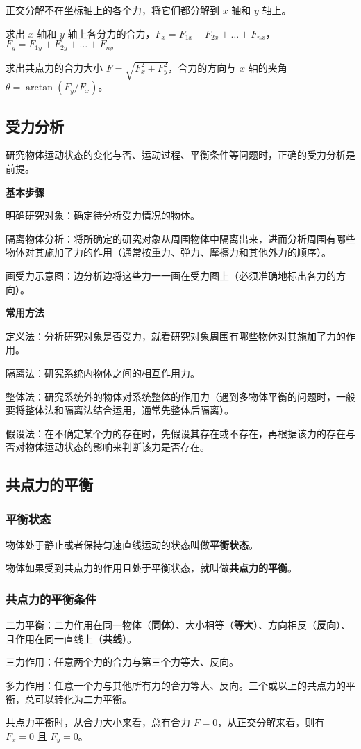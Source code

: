 正交分解不在坐标轴上的各个力，将它们都分解到 $x$ 轴和 $y$ 轴上。

求出 $x$ 轴和 $y$ 轴上各分力的合力，$F_{x}=F_{{1x}}+F_{{2x}}+\dots+F_{{nx}}$，$F_{y}=F_{{1y}}+F_{{2y}}+\dots+F_{{ny}}$

求出共点力的合力大小 $F=\sqrt{F_x^2+F_y^2}$，合力的方向与 $x$ 轴的夹角 $\theta=\arctan(F_y/F_x)$。

\subsection{受力分析}
研究物体运动状态的变化与否、运动过程、平衡条件等问题时，正确的受力分析是前提。

\textbf{基本步骤}

明确研究对象：确定待分析受力情况的物体。

隔离物体分析：将所确定的研究对象从周围物体中隔离出来，进而分析周围有哪些物体对其施加了力的作用（通常按重力、弹力、摩擦力和其他外力的顺序）。

画受力示意图：边分析边将这些力一一画在受力图上（必须准确地标出各力的方向）。

\textbf{常用方法}

定义法：分析研究对象是否受力，就看研究对象周围有哪些物体对其施加了力的作用。

隔离法：研究系统内物体之间的相互作用力。

整体法：研究系统外的物体对系统整体的作用力（遇到多物体平衡的问题时，一般要将整体法和隔离法结合运用，通常先整体后隔离）。

假设法：在不确定某个力的存在时，先假设其存在或不存在，再根据该力的存在与否对物体运动状态的影响来判断该力是否存在。

\subsection{共点力的平衡}
\subsubsection{平衡状态}
物体处于静止或者保持匀速直线运动的状态叫做\textbf{平衡状态}。

物体如果受到共点力的作用且处于平衡状态，就叫做\textbf{共点力的平衡}。

\subsubsection{共点力的平衡条件}
二力平衡：二力作用在同一物体（\textbf{同体}）、大小相等（\textbf{等大}）、方向相反（\textbf{反向}）、且作用在同一直线上（\textbf{共线}）。

三力作用：任意两个力的合力与第三个力等大、反向。

多力作用：任意一个力与其他所有力的合力等大、反向。三个或以上的共点力的平衡，总可以转化为二力平衡。

共点力平衡时，从合力大小来看，总有合力 $F=0$，从正交分解来看，则有 $F_x=0$ 且 $F_y=0$。